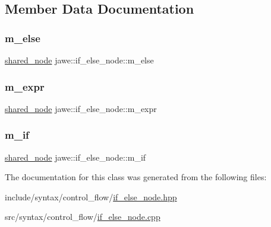 \subsection{Member Data Documentation}
\mbox{\label{classjawe_1_1if__else__node_a7b8b1d90c0b27970fe96a73259236c73}} 
\subsubsection{\texorpdfstring{m\+\_\+else}{m\_else}}
{\footnotesize\ttfamily \hyperlink{namespacejawe_a3f307481d921b6cbb50cc8511fc2b544}{shared\+\_\+node} jawe\+::if\+\_\+else\+\_\+node\+::m\+\_\+else\hspace{0.3cm}{\ttfamily [private]}}

\mbox{\label{classjawe_1_1if__else__node_ae089a0d09e1ea114212f494af2ca3a0d}} 
\subsubsection{\texorpdfstring{m\+\_\+expr}{m\_expr}}
{\footnotesize\ttfamily \hyperlink{namespacejawe_a3f307481d921b6cbb50cc8511fc2b544}{shared\+\_\+node} jawe\+::if\+\_\+else\+\_\+node\+::m\+\_\+expr\hspace{0.3cm}{\ttfamily [private]}}

\mbox{\label{classjawe_1_1if__else__node_abc51dd41b42dcacd97c83c5bdd285ca2}} 
\subsubsection{\texorpdfstring{m\+\_\+if}{m\_if}}
{\footnotesize\ttfamily \hyperlink{namespacejawe_a3f307481d921b6cbb50cc8511fc2b544}{shared\+\_\+node} jawe\+::if\+\_\+else\+\_\+node\+::m\+\_\+if\hspace{0.3cm}{\ttfamily [private]}}



The documentation for this class was generated from the following files\+:\begin{DoxyCompactItemize}
\item 
include/syntax/control\+\_\+flow/\hyperlink{if__else__node_8hpp}{if\+\_\+else\+\_\+node.\+hpp}\item 
src/syntax/control\+\_\+flow/\hyperlink{if__else__node_8cpp}{if\+\_\+else\+\_\+node.\+cpp}\end{DoxyCompactItemize}
